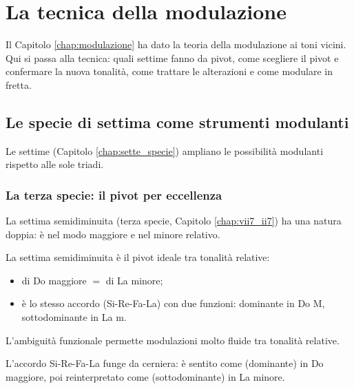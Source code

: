 \chapter{La tecnica della modulazione}
\label{chap:tecnica_modulazione}

Il Capitolo \ref{chap:modulazione} ha dato la teoria della modulazione ai toni vicini. Qui si passa alla tecnica: quali settime fanno da pivot, come scegliere il pivot e confermare la nuova tonalità, come trattare le alterazioni e come modulare in fretta.

\section{Le specie di settima come strumenti modulanti}
\label{sec:specie_modulazione}

Le settime (Capitolo \ref{chap:sette_specie}) ampliano le possibilità modulanti rispetto alle sole triadi.

\subsection{La terza specie: il pivot per eccellenza}
\label{subsec:terza_specie_pivot}

La settima semidiminuita (terza specie, Capitolo \ref{chap:vii7_ii7}) ha una natura doppia: è  nel modo maggiore e  nel minore relativo.

\begin{regola}
	\label{reg:terza_specie_pivot}
	La settima semidiminuita è il pivot ideale tra tonalità relative:
	\begin{itemize}
		\item {} di Do maggiore $=$  di La minore;
		\item è lo stesso accordo (Si-Re-Fa-La) con due funzioni: dominante in Do M, sottodominante in La m.
	\end{itemize}
	L'ambiguità funzionale permette modulazioni molto fluide tra tonalità relative.
\end{regola}

\begin{esempio}[Modulazione con \sigla{VIIø}{7}{} $=$ \sigla{IIø}{7}{} come pivot]
	\label{ex:mod_terza_specie}
	L'accordo Si-Re-Fa-La funge da cerniera: è sentito come  (dominante) in Do maggiore, poi reinterpretato come  (sottodominante) in La minore.
\end{esempio}

